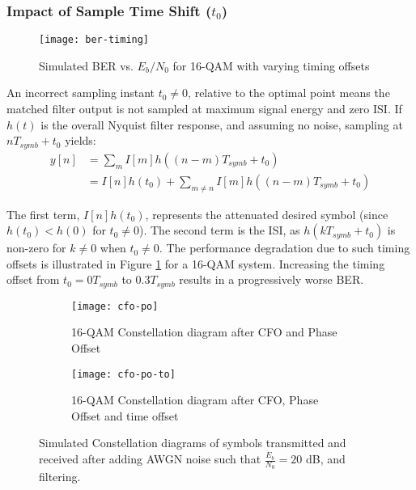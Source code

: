 \subsubsection{Impact of Sample Time Shift ($t_0$)}
\begin{figure}[H]
    \centering
    \texttt{[image: ber-timing]}
    \caption{Simulated BER vs. $E_b/N_0$ for 16-QAM with varying timing offsets}
    \label{fig:ber-timing}
\end{figure}
An incorrect sampling instant $t_0 \neq 0$, relative to the optimal point means the matched filter output is not sampled at maximum signal energy and zero ISI. If $h(t)$ is the overall Nyquist filter response, and assuming no noise, sampling at $nT_{symb} + t_0$ yields:
\begin{align}
	y[n] &= \sum_m I[m]h((n-m)T_{symb} + t_0) \\
	&= I[n]h(t_0) + \sum_{m \neq n} I[m]h((n-m)T_{symb} + t_0) \label{eq:timing_offset_impact_revised}
\end{align}

\par
The first term, $I[n]h(t_0)$, represents the attenuated desired symbol (since $h(t_0) < h(0)$ for $t_0 \neq 0$). The second term is the ISI, as $h(kT_{symb} + t_0)$ is non-zero for $k \neq 0$ when $t_0 \neq 0$. The performance degradation due to such timing offsets is illustrated in Figure \ref{fig:ber-timing} for a 16-QAM system. Increasing the timing offset from $t_0 = 0 T_{symb}$ to $0.3 T_{symb}$ results in a progressively worse BER.

\begin{figure}[H]
	\centering
	\begin{subfigure}[b]{0.48\textwidth}
		\centering
		\texttt{[image: cfo-po]}
		\caption{16-QAM Constellation diagram after CFO and Phase Offset}
		\label{fig:cfo-po-sub}
	\end{subfigure}
	\hfill 
	\begin{subfigure}[b]{0.48\textwidth}
		\centering
		\texttt{[image: cfo-po-to]}
		\caption{16-QAM Constellation diagram after CFO, Phase Offset and time offset}
		\label{fig:cfo-po-to-sub}
	\end{subfigure}
	\caption{Simulated Constellation diagrams of symbols transmitted and received after adding AWGN noise such that $\frac{E_b}{N_0} = 20$ dB, and filtering.}
	\label{fig:cfo-combined}
\end{figure}